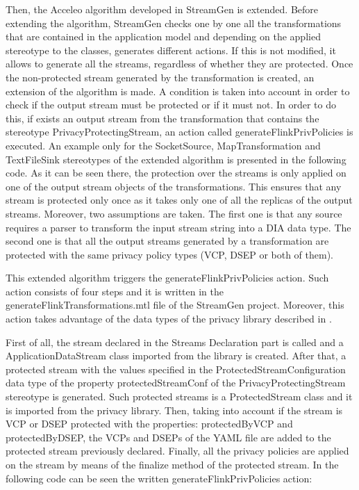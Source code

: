 Then, the Acceleo algorithm developed in StreamGen is extended. Before extending the algorithm, StreamGen checks one by one all the transformations that are contained in the application model and depending on the applied stereotype to the classes, generates different actions. If this is not modified, it allows to generate all the streams, regardless of whether they are protected. Once the non-protected stream generated by the transformation is created, an extension of the algorithm is made. A condition is taken into account in order to check if the output stream must be protected or if it must not. In order to do this, if exists an output stream from the transformation that contains the stereotype PrivacyProtectingStream, an action called generateFlinkPrivPolicies is executed. An example only for the SocketSource, MapTransformation and TextFileSink stereotypes of the extended algorithm is presented in the following code. As it can be seen there, the protection over the streams is only applied on one of the output stream objects of the transformations. This ensures that any stream is protected only once as it takes only one of all the replicas of the output streams. Moreover, two assumptions are taken. The first one is that any source requires a parser to transform the input stream string into a DIA data type. The second one is that all the output streams generated by a transformation are protected with the same privacy policy types (VCP, DSEP or both of them).



This extended algorithm triggers the generateFlinkPrivPolicies action. Such action consists of four steps and it is written in the generateFlinkTransformations.mtl file of the StreamGen project. Moreover, this action takes advantage of the data types of the privacy library described in \cite{privacypoliciesarticle}.

First of all, the stream declared in the Streams Declaration part is called and a ApplicationDataStream class imported from the library is created. After that, a protected stream with the values specified in the ProtectedStreamConfiguration data type of the property protectedStreamConf of the PrivacyProtectingStream stereotype is generated. Such protected streams is a ProtectedStream class and it is imported from the privacy library. Then, taking into account if the stream is VCP or DSEP protected with the properties: protectedByVCP and protectedByDSEP, the VCPs and DSEPs of the YAML file are added to the protected stream previously declared. Finally, all the privacy policies are applied on the stream by means of the finalize method of the protected stream. In the following code can be seen the written generateFlinkPrivPolicies action:

